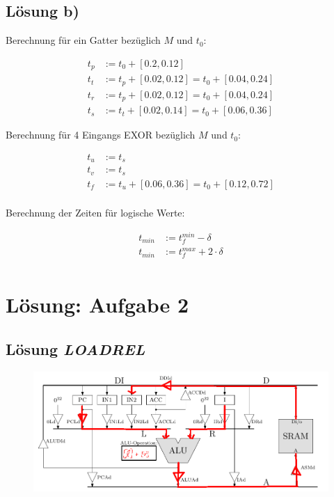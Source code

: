 \documentclass{scrartcl}[9pt, a4paper]
\begin{document}
\subsection*{Lösung b)}

Berechnung für ein Gatter bezüglich $M$ und $t_0$:

\begin{align*}
	t_p & := t_0 + [0.2, 0.12]                       \\
	t_t & := t_p + [0.02, 0.12] = t_0 + [0.04, 0.24] \\
	t_r & := t_p + [0.02, 0.12] = t_0 + [0.04, 0.24] \\
	t_s & := t_t + [0.02, 0.14] = t_0 + [0.06, 0.36]
\end{align*}

Berechnung für 4 Eingangs EXOR bezüglich $M$ und $t_0$:

\begin{align*}
	t_u & := t_s                                     \\
	t_v & := t_s                                     \\
	t_f & := t_u + [0.06, 0.36] = t_0 + [0.12, 0.72] \\
\end{align*}

Berechnung der Zeiten für logische Werte:

\begin{align*}
	t_{min} & := t_f^{min} - \delta         \\
	t_{min} & := t_f^{max} + 2 \cdot \delta \\
\end{align*}

\pagebreak
\section*{Lösung: Aufgabe 2}

\subsection*{Lösung \emph{LOADREL}}

\begin{figure}[h]
	\centering
	\includegraphics[width=.8\textwidth]{figs/retil1}
\end{figure}
\end{document}
